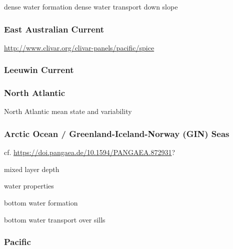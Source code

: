 \documentclass[11pt]{article}
\begin{document}
dense water formation
dense water transport down slope

\subsubsection{East Australian Current}
\citet{LaurindoMarianoLumpkin2017a}
\citet{ArcherRoughanKeatingSchaeffer2017a, ArcherShayJohns2017a, ArcherKeatingRoughanJohnsLumpkinBeron-VeraShay2018a}
\citet{WijeratnePattiaratchiProctor2018a}
\citet{ZilbermanRoemmichGilleGilson2018a, ZilbermanRoemmichGille2014a}
\citet{FengZhangOkeMonselesanChamberlainMatearSchiller2016a}

\url{http://www.clivar.org/clivar-panels/pacific/spice}

\subsubsection{Leeuwin Current}
\citet{WijeratnePattiaratchiProctor2018a}
\citet{FengZhangOkeMonselesanChamberlainMatearSchiller2016a}

\subsubsection{North Atlantic}
North Atlantic mean state \citet{DanabasogluYeagerBaileyBehrensBentsenBiBiastochBoningBozec2014a}
and variability \citet{DanabasogluYeagerKimBehrensBentsenBiBiastochBleckBoning2016a}

\subsubsection{Arctic Ocean / Greenland-Iceland-Norway (GIN) Seas}

cf. \citet{BehrendtSumataRabeSchauer2018a} \url{https://doi.pangaea.de/10.1594/PANGAEA.872931}?

mixed layer depth

water properties

bottom water formation

bottom water transport over sills

\citet{WangIlicakGerdesDrangeAksenovBaileyBentsenBiastochBozec2016b}
\citet{IlicakDrangeWangGerdesAksenovBaileyBentsenBiastochBozec2016a}

\subsubsection{Pacific}
\citet{TsengLinChenThompsonBentsenBoningBozecCassouChassignet2016a}
\end{document}
